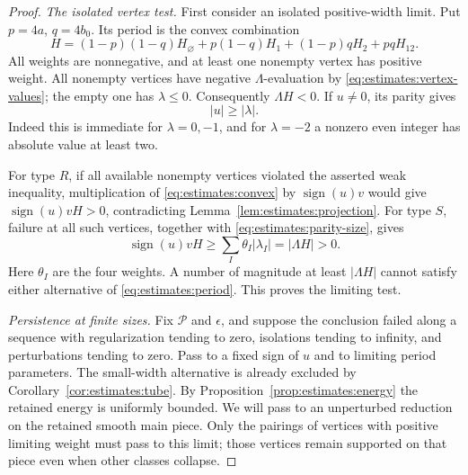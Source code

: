 \begin{proof}
\emph{The isolated vertex test.}
First consider an isolated positive-width limit.  Put
$p=4a$, $q=4b_0$.  Its period is the convex combination
\begin{equation}
 H=(1-p)(1-q)H_\varnothing+p(1-q)H_1
              +(1-p)qH_2+pqH_{12}.
 \label{eq:estimates:convex}
\end{equation}
All weights are nonnegative, and at least one nonempty vertex has
positive weight.  All nonempty vertices have negative
$\Lambda$-evaluation by \eqref{eq:estimates:vertex-values}; the empty
one has $\lambda\leq0$.  Consequently $\Lambda H<0$.
If $u\ne0$, its parity gives
\begin{equation}
                         |u|\geq|\lambda|.
                         \label{eq:estimates:parity-size}
\end{equation}
Indeed this is immediate for $\lambda=0,-1$, and for $\lambda=-2$
a nonzero even integer has absolute value at least two.

For type $R$, if all available nonempty vertices violated the
asserted weak inequality, multiplication of
\eqref{eq:estimates:convex} by $\operatorname{sign}(u)v$ would give
$\operatorname{sign}(u)vH>0$, contradicting
Lemma~\ref{lem:estimates:projection}.  For type $S$, failure at all
such vertices, together with \eqref{eq:estimates:parity-size}, gives
\[
       \operatorname{sign}(u)vH
       \geq\sum_I\theta_I|\lambda_I|
       =|\Lambda H|>0.
\]
Here $\theta_I$ are the four weights.  A number of magnitude at
least $|\Lambda H|$ cannot satisfy either alternative of
\eqref{eq:estimates:period}.  This proves the limiting test.

\emph{Persistence at finite sizes.}
Fix $\mathcal P$ and $\epsilon$, and suppose the conclusion failed
along a sequence
with regularization tending to zero, isolations tending to infinity,
and perturbations tending to zero.  Pass to a fixed sign of $u$ and
to limiting period parameters.  The small-width alternative is already
excluded by Corollary~\ref{cor:estimates:tube}.
By Proposition~\ref{prop:estimates:energy} the retained energy is
uniformly bounded.  We will pass to an unperturbed reduction on the
retained smooth main piece.  Only the pairings of vertices with positive
limiting weight must pass to this limit; those vertices remain supported
on that piece even when other classes collapse.


\end{proof}
